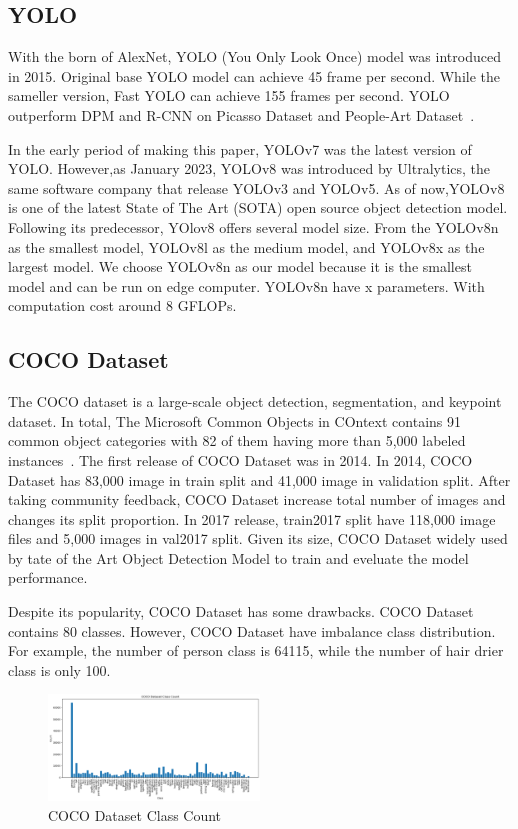 \documentclass[conference]{IEEEtran}
\begin{document}
\subsection{YOLO}
With the born of AlexNet, YOLO (You Only Look Once) model was introduced in 2015. Original base YOLO model can achieve 45 frame per second.
While the sameller version, Fast YOLO can achieve 155 frames per second.
YOLO outperform DPM and R-CNN on Picasso Dataset and People-Art Dataset~\cite{You Only Look Once}.

In the early period of making this paper, YOLOv7 was the latest version of YOLO\@.
However,as January 2023, YOLOv8 was introduced by Ultralytics, the same software company that release YOLOv3 and YOLOv5. 
As of now,YOLOv8 is one of the latest State of The Art (SOTA) open source object detection model. Following its predecessor, YOlov8 offers several model size.
From the YOLOv8n as the smallest model, YOLOv8l as the medium model, and YOLOv8x as the largest model.
We choose YOLOv8n as our model because it is the smallest model and can be run on edge computer.
YOLOv8n have x parameters. With computation cost around 8 GFLOPs.
\subsection{COCO Dataset}\label{AA}
The COCO dataset is a large-scale object detection, segmentation, and keypoint dataset.
In total, The Microsoft Common Objects in COntext contains 91 common object categories with 82 of them having more than 5,000 labeled instances~\cite{COCO Dataset}.
The first release of COCO Dataset was in 2014. In 2014, COCO Dataset has 83,000 image in train split and 41,000 image in validation split.
After taking community feedback, COCO Dataset increase total number of images and changes its split proportion. In 2017 release, train2017 split have 118,000 image files and 5,000 images in val2017 split.
Given its size, COCO Dataset widely used by tate of the Art Object Detection Model to train and eveluate the model performance.

Despite its popularity, COCO Dataset has some drawbacks. COCO Dataset contains 80 classes. However, COCO Dataset have imbalance class distribution.
For example, the number of person class is 64115, while the number of hair drier class is only 100.
\begin{figure}[h]
\centering
\includegraphics[width=0.5\textwidth,keepaspectratio]{coco_class_count.png}
\caption{COCO Dataset Class Count}
\end{figure}
\end{document}
